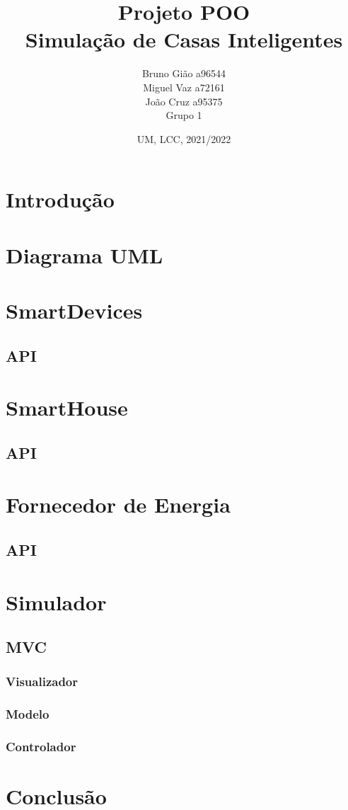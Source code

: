 \documentclass[10pt, a4paper]{article}
\title{Projeto POO\\
        Simulação de Casas Inteligentes}
\author{Bruno Gião a96544 \\ Miguel Vaz a72161 \\ João Cruz a95375 \\ Grupo 1}
\date{UM, LCC, 2021/2022}
\begin{document}
\maketitle
\begin{abstract}
    
\end{abstract}

\newpage
\tableofcontents
\newpage

\section{Introdução}
\section{Diagrama UML}
\section{SmartDevices}
\subsection{API}
\section{SmartHouse}
\subsection{API}
\section{Fornecedor de Energia}
\subsection{API}
\section{Simulador}
\subsection{MVC}
\subsubsection{Visualizador}
\subsubsection{Modelo}
\subsubsection{Controlador}

\newpage
\section{Conclusão}
\end{document}
